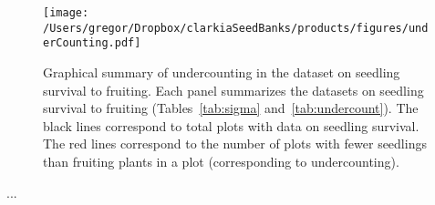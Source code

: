\documentclass[12pt, oneside, titlepage]{article}   	%
\begin{document}
  \begin{figure}[h]
   \centering
       \texttt{[image: /Users/gregor/Dropbox/clarkiaSeedBanks/products/figures/underCounting.pdf]}  
    \caption{ Graphical summary of undercounting in the dataset on seedling survival to fruiting. Each panel summarizes the datasets on seedling survival to fruiting (Tables~\ref{tab:sigma} and~\ref{tab:undercount}). The black lines correspond to total plots with data on seedling survival. The red lines correspond to the number of plots with fewer seedlings than fruiting plants in a plot (corresponding to undercounting). }
 \label{fig:obs_pred}
\end{figure}
 
  \newpage
 

...

  \newpage
 
 
\end{document}
